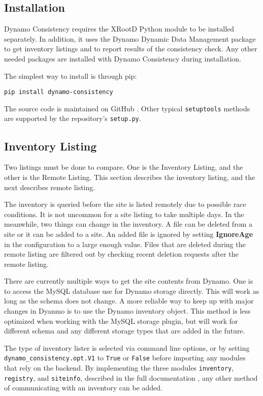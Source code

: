 \subsection{Installation}

Dynamo Consistency requires the XRootD \cite{dorigo2005xrootd}
Python module to be installed separately.
In addition, it uses the Dynamo Dynamic Data Management package to get inventory listings
and to report results of the consistency check.
Any other needed packages are installed with Dynamo Consistency during installation.

The simplest way to install is through pip:

\begin{verbatim}
pip install dynamo-consistency
\end{verbatim}

The source code is maintained on GitHub \cite{dynamo_consistency_src}.
Other typical \texttt{setuptools} methods are supported by
the repository’s \texttt{setup.py}.

\subsection{Inventory Listing}

Two listings must be done to compare.
One is the Inventory Listing,
and the other is the Remote Listing.
This section describes the inventory listing, and the next describes remote listing.

The inventory is queried before the site is listed remotely due to possible race conditions.
It is not uncommon for a site listing to take multiple days.
In the meanwhile, two things can change in the inventory.
A file can be deleted from a site or it can be added to a site.
An added file is ignored by setting {\bf IgnoreAge}
in the configuration to a large enough value.
Files that are deleted during the remote listing
are filtered out by checking recent deletion requests after the remote listing.

There are currently multiple ways to get the site contents from Dynamo.
One is to access the MySQL database use for Dynamo storage directly.
This will work as long as the schema does not change.
A more reliable way to keep up with major changes in Dyanmo
is to use the Dynamo inventory object.
This method is less optimized when working with the MySQL storage plugin,
but will work for different schema and any different storage types
that are added in the future.

The type of inventory lister is selected via command line options,
or by setting \texttt{dynamo\_consistency.opt.V1} to \texttt{True} or \texttt{False}
before importing any modules that rely on the backend.
By implementing the three modules \texttt{inventory}, \texttt{registry},
and \texttt{siteinfo}, described in the full documentation \cite{dynamo_consistency},
any other method of communicating with an inventory can be added.

